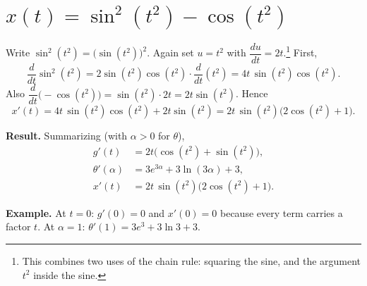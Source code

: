 \documentclass[11pt]{article}
\newcommand{\resultbox}[1]{%
  \begin{savenotes}%
  \begingroup\setlength{\fboxsep}{10pt}\noindent
  \colorbox{purple!8}{\parbox{\dimexpr\linewidth-2\fboxsep\relax}{\textbf{Result. }#1}}
  \endgroup
  \end{savenotes}%
}
\newcommand{\examplebox}[1]{%
  \begin{savenotes}%
  \begingroup\setlength{\fboxsep}{10pt}\noindent
  \colorbox{green!8}{\parbox{\dimexpr\linewidth-2\fboxsep\relax}{\textbf{Example. }#1}}
  \endgroup
  \end{savenotes}%
}
\begin{document}
\section*{\(x(t)=\sin^2(t^2)-\cos(t^2)\)}
Write \(\sin^2(t^2)=\bigl(\sin(t^2)\bigr)^2\). Again set \(u=t^2\) with
\(\dfrac{du}{dt}=2t\).\footnote{This combines two uses of the chain rule: squaring
the sine, and the argument \(t^2\) inside the sine.} First,
\[
\frac{d}{dt}\sin^2(t^2)=2\sin(t^2)\cos(t^2)\cdot\frac{d}{dt}(t^2)
=4t\,\sin(t^2)\cos(t^2).
\]
Also \(\dfrac{d}{dt}\bigl(-\cos(t^2)\bigr)=\sin(t^2)\cdot 2t=2t\sin(t^2)\). Hence
\[
x'(t)=4t\,\sin(t^2)\cos(t^2)+2t\sin(t^2)
=2t\,\sin(t^2)\bigl(2\cos(t^2)+1\bigr).
\]

\resultbox{Summarizing (with \(\alpha>0\) for \(\theta\)),
\[
\begin{aligned}
g'(t) &= 2t\bigl(\cos(t^2)+\sin(t^2)\bigr),\\
\theta'(\alpha) &= 3e^{3\alpha}+3\ln(3\alpha)+3,\\
x'(t) &= 2t\,\sin(t^2)\bigl(2\cos(t^2)+1\bigr).
\end{aligned}
\]}

\examplebox{At \(t=0\): \(g'(0)=0\) and \(x'(0)=0\) because every term carries a
factor \(t\). At \(\alpha=1\): \(\theta'(1)=3e^3+3\ln 3+3\).}
\end{document}
